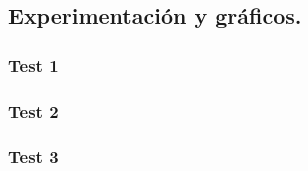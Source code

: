 \vspace*{0.3cm}


\vspace*{0.6cm}

\subsection{Experimentación y gráficos.}

\vspace*{0.3cm}


\subsubsection{Test 1}

\vspace*{0.3cm}


\vspace*{0.6cm}

\subsubsection{Test 2}

\vspace*{0.3cm}


\vspace*{0.6cm}

\subsubsection{Test 3}

\vspace*{0.3cm}

